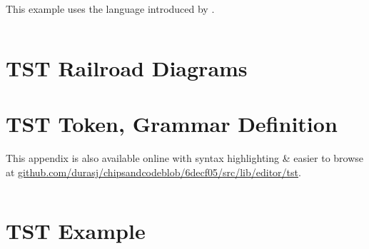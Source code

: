 This example uses the language introduced by \textcite{nand2tetris}.

\inputminted[breaklines=true,fontsize=\footnotesize]{text}{./assets/Xor.hdl}

\chapter{TST Railroad Diagrams}
\label{appendix:tst-railroad}

\noindent


\vspace{20pt}

\noindent


\vspace{20pt}

\noindent


\vspace{20pt}

\noindent


\vspace{20pt}

\noindent


\vspace{20pt}

\noindent


\vspace{20pt}

\noindent


\vspace{20pt}

\noindent


\chapter{TST Token, Grammar Definition}
\label{appendix:tst-grammar}

This appendix is also available online with syntax highlighting \& easier to browse at \href{https://github.com/durasj/chipsandcode/blob/6decf05115ba1d4ca927de42f63c8431b1ac3124/src/lib/editor/tst/grammar.ne}{github.com/durasj/chipsandcodeblob/6decf05/src/lib/editor/tst}.

\inputminted[breaklines=true,fontsize=\footnotesize]{text}{./assets/tst.ne}

\chapter{TST Example}
\label{appendix:tst-example}

